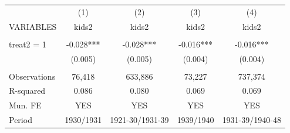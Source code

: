 \begin{tabular}{lcccc} \hline
 & (1) & (2) & (3) & (4) \\
VARIABLES & kids2 & kids2 & kids2 & kids2 \\ \hline
 &  &  &  &  \\
treat2 = 1 & -0.028*** & -0.028*** & -0.016*** & -0.016*** \\
 & (0.005) & (0.005) & (0.004) & (0.004) \\
 &  &  &  &  \\
Observations & 76,418 & 633,886 & 73,227 & 737,374 \\
R-squared & 0.086 & 0.080 & 0.069 & 0.069 \\
Mun. FE & YES & YES & YES & YES \\
 Period & 1930/1931 & 1921-30/1931-39 & 1939/1940 & 1931-39/1940-48 \\ \hline
\end{tabular}
